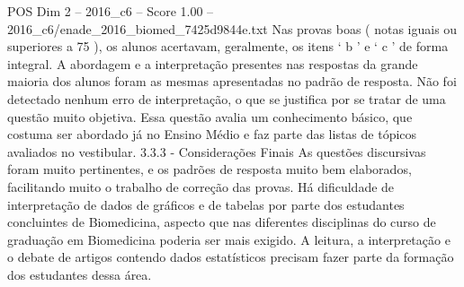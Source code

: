 \begin{textsample}{POS Dim 2 – 2016\_c6 – Score 1.00 – 2016\_c6/enade\_2016\_biomed\_7425d9844e.txt}
Nas provas boas ( notas iguais ou superiores a 75 ), os alunos acertavam, geralmente, os itens ‘ b ’ e ‘ c ’ de forma integral.
A abordagem e a interpretação presentes nas respostas da grande maioria dos alunos foram as mesmas apresentadas no padrão de resposta.
Não foi detectado nenhum erro de interpretação, o que se justifica por se tratar de uma questão muito objetiva.
Essa questão avalia um conhecimento básico, que costuma ser abordado já no Ensino Médio e faz parte das listas de tópicos avaliados no vestibular. 3.3.3 - Considerações Finais As questões discursivas foram muito pertinentes, e os padrões de resposta muito bem elaborados, facilitando muito o trabalho de correção das provas.
Há dificuldade de interpretação de dados de gráficos e de tabelas por parte dos estudantes concluintes de Biomedicina, aspecto que nas diferentes disciplinas do curso de graduação em Biomedicina poderia ser mais exigido.
A leitura, a interpretação e o debate de artigos contendo dados estatísticos precisam fazer parte da formação dos estudantes dessa área.

\end{textsample}
